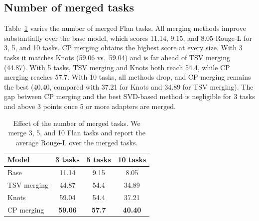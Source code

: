 \documentclass[10pt]{article} %
\begin{document}


    


\subsection{Number of merged tasks}


Table~\ref{tab:tasks_size} varies the number of merged Flan tasks. All merging methods improve substantially over the base model, which scores 11.14, 9.15, and 8.05 Rouge-L for 3, 5, and 10 tasks. CP merging obtains the highest score at every size. With 3 tasks it matches Knots (59.06 vs.\ 59.04) and is far ahead of TSV merging (44.87). With 5 tasks, TSV merging and Knots both reach 54.4, while CP merging reaches 57.7. With 10 tasks, all methods drop, and CP merging remains the best (40.40, compared with 37.21 for Knots and 34.89 for TSV merging). The gap between CP merging and the best SVD-based method is negligible for 3 tasks and above 3 points once 5 or more adapters are merged.
\begin{table}[h]
    \centering
    \begin{tabular}{l|ccc}
    \toprule
      Model  & 3 tasks & 5 tasks & 10 tasks \\
    \midrule
     Base    & 11.14 & 9.15 & 8.05\\
     TSV merging & 44.87 & 54.4 & 34.89\\
     Knots & 59.04 & 54.4& 37.21\\
     \midrule
     CP merging & \textbf{59.06} & \textbf{57.7} & \textbf{40.40}\\
     \bottomrule
    \end{tabular}
    \caption{Effect of the number of merged tasks. We merge 3, 5, and 10 Flan tasks and report the average Rouge-L over the merged tasks.}
    \label{tab:tasks_size}
\end{table}
\end{document}
